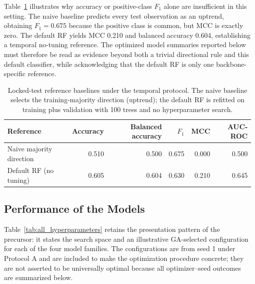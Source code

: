 Table~\ref{tab:reference_baselines} illustrates why accuracy or positive-class $F_1$ alone are insufficient in this setting. The naive baseline predicts every test observation as an uptrend, obtaining $F_1=0.675$ because the positive class is common, but MCC is exactly zero. The default RF yields MCC 0.210 and balanced accuracy 0.604, establishing a temporal no-tuning reference. The optimized model summaries reported below must therefore be read as evidence beyond both a trivial directional rule and this default classifier, while acknowledging that the default RF is only one backbone-specific reference.

\begin{table}[htbp]
\centering
\caption{Locked-test reference baselines under the temporal protocol. The naive baseline selects the training-majority direction (uptrend); the default RF is refitted on training plus validation with 100 trees and no hyperparameter search.}
\label{tab:reference_baselines}
\footnotesize
\begin{tabular}{lrrrrr}\toprule
\textbf{Reference} & \textbf{Accuracy} & \textbf{Balanced accuracy} & \textbf{$F_1$} & \textbf{MCC} & \textbf{AUC-ROC}\\\midrule
Naive majority direction & 0.510 & 0.500 & 0.675 & 0.000 & 0.500\\
Default RF (no tuning) & 0.605 & 0.604 & 0.630 & 0.210 & 0.645\\\bottomrule
\end{tabular}
\end{table}

\subsection{Performance of the Models}
\label{sec:performance_models}

Table~\ref{tab:all_hyperparameters} retains the presentation pattern of the precursor: it states the search space and an illustrative GA-selected configuration for each of the four model families. The configurations are from seed 1 under Protocol A and are included to make the optimization procedure concrete; they are not asserted to be universally optimal because all optimizer--seed outcomes are summarized below.

